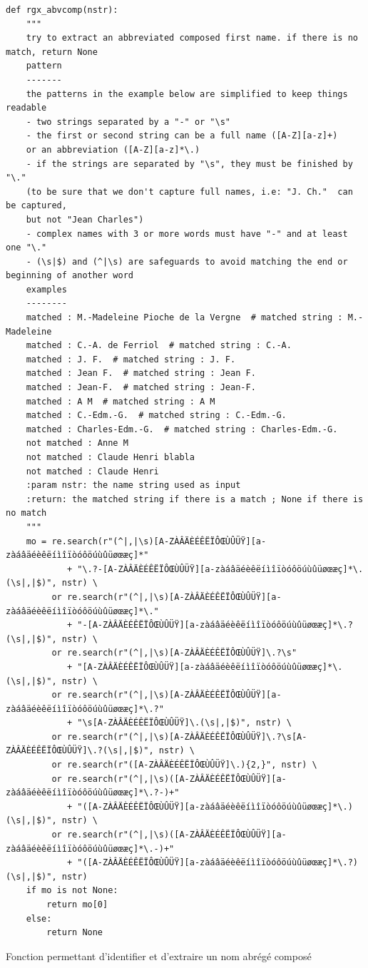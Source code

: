 \begin{listing}[p]
	\begin{verbatim}
def rgx_abvcomp(nstr):
	"""
	try to extract an abbreviated composed first name. if there is no match, return None
	pattern
	-------
	the patterns in the example below are simplified to keep things readable
	- two strings separated by a "-" or "\s"
	- the first or second string can be a full name ([A-Z][a-z]+)
	or an abbreviation ([A-Z][a-z]*\.)
	- if the strings are separated by "\s", they must be finished by "\."
	(to be sure that we don't capture full names, i.e: "J. Ch."  can be captured,
	but not "Jean Charles")
	- complex names with 3 or more words must have "-" and at least one "\."
	- (\s|$) and (^|\s) are safeguards to avoid matching the end or beginning of another word
	examples
	--------
	matched : M.-Madeleine Pioche de la Vergne  # matched string : M.-Madeleine
	matched : C.-A. de Ferriol  # matched string : C.-A.
	matched : J. F.  # matched string : J. F.
	matched : Jean F.  # matched string : Jean F.
	matched : Jean-F.  # matched string : Jean-F.
	matched : A M  # matched string : A M
	matched : C.-Edm.-G.  # matched string : C.-Edm.-G.
	matched : Charles-Edm.-G.  # matched string : Charles-Edm.-G.
	not matched : Anne M
	not matched : Claude Henri blabla
	not matched : Claude Henri
	:param nstr: the name string used as input
	:return: the matched string if there is a match ; None if there is no match
	"""
	mo = re.search(r"(^|,|\s)[A-ZÀÂÄÈÉÊËÏÔŒÙÛÜŸ][a-zàáâäéèêëíìîïòóôöúùûüøœæç]*"
			+ "\.?-[A-ZÀÂÄÈÉÊËÏÔŒÙÛÜŸ][a-zàáâäéèêëíìîïòóôöúùûüøœæç]*\.(\s|,|$)", nstr) \
		 or re.search(r"(^|,|\s)[A-ZÀÂÄÈÉÊËÏÔŒÙÛÜŸ][a-zàáâäéèêëíìîïòóôöúùûüøœæç]*\."
			+ "-[A-ZÀÂÄÈÉÊËÏÔŒÙÛÜŸ][a-zàáâäéèêëíìîïòóôöúùûüøœæç]*\.?(\s|,|$)", nstr) \
		 or re.search(r"(^|,|\s)[A-ZÀÂÄÈÉÊËÏÔŒÙÛÜŸ]\.?\s"
			+ "[A-ZÀÂÄÈÉÊËÏÔŒÙÛÜŸ][a-zàáâäéèêëíìîïòóôöúùûüøœæç]*\.(\s|,|$)", nstr) \
		 or re.search(r"(^|,|\s)[A-ZÀÂÄÈÉÊËÏÔŒÙÛÜŸ][a-zàáâäéèêëíìîïòóôöúùûüøœæç]*\.?"
		    + "\s[A-ZÀÂÄÈÉÊËÏÔŒÙÛÜŸ]\.(\s|,|$)", nstr) \
		 or re.search(r"(^|,|\s)[A-ZÀÂÄÈÉÊËÏÔŒÙÛÜŸ]\.?\s[A-ZÀÂÄÈÉÊËÏÔŒÙÛÜŸ]\.?(\s|,|$)", nstr) \
		 or re.search(r"([A-ZÀÂÄÈÉÊËÏÔŒÙÛÜŸ]\.){2,}", nstr) \
		 or re.search(r"(^|,|\s)([A-ZÀÂÄÈÉÊËÏÔŒÙÛÜŸ][a-zàáâäéèêëíìîïòóôöúùûüøœæç]*\.?-)+"
			+ "([A-ZÀÂÄÈÉÊËÏÔŒÙÛÜŸ][a-zàáâäéèêëíìîïòóôöúùûüøœæç]*\.)(\s|,|$)", nstr) \
		 or re.search(r"(^|,|\s)([A-ZÀÂÄÈÉÊËÏÔŒÙÛÜŸ][a-zàáâäéèêëíìîïòóôöúùûüøœæç]*\.-)+"
		  	+ "([A-ZÀÂÄÈÉÊËÏÔŒÙÛÜŸ][a-zàáâäéèêëíìîïòóôöúùûüøœæç]*\.?)(\s|,|$)", nstr)
	if mo is not None:
		return mo[0]
	else:
		return None
	\end{verbatim}
	\caption{Fonction permettant d'identifier et d'extraire un nom abrégé composé}
	\label{appendix:rgxabvcomp}
\end{listing}

